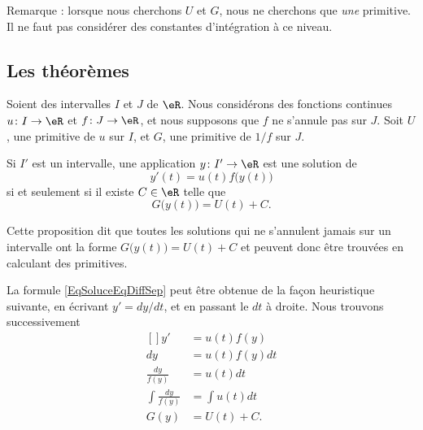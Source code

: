 Remarque : lorsque nous cherchons \( U\) et \( G\), nous ne cherchons que \emph{une} primitive. Il ne faut pas considérer des constantes d'intégration à ce niveau.

\subsection{Les théorèmes}

\begin{proposition}     \label{ProJLykrK}
	Soient des intervalles \( I\) et \( J\) de \( \eR\). Nous considérons des fonctions continues \( u\colon I\to \eR\) et \( f\colon J\to \eR\), et nous supposons que \( f\) ne s'annule pas sur \( J\). Soit \( U\), une primitive de \( u\) sur \( I\), et \( G\), une primitive de \( 1/f\) sur \( J\).

	Si \( I'\) est un intervalle, une application \( y\colon I'\to \eR\) est une solution de
	\begin{equation}		\label{EQooJVCQooGoVPVA}
		y'(t)=u(t)f\big( y(t) \big)
	\end{equation}
	si et seulement si il existe \( C\in \eR\) telle que
	\begin{equation}		\label{EqSoluceEqDiffSep}
		G\big( y(t) \big)=U(t)+C.
	\end{equation}
\end{proposition}
Cette proposition dit que toutes les solutions qui ne s'annulent jamais sur un intervalle ont la forme \( G\big( y(t) \big)=U(t)+C\) et peuvent donc être trouvées en calculant des primitives.

La formule \eqref{EqSoluceEqDiffSep} peut être obtenue de la façon heuristique suivante, en écrivant \( y'=dy/dt\), et en passant le \( dt\) à droite. Nous trouvons successivement
\begin{equation}
	\begin{aligned}[]
		y'                      & =u(t)f(y)    \\
		dy                      & =u(t)f(y)dt  \\
		\frac{ dy }{ f(y) }     & =u(t)dt      \\
		\int\frac{ dy }{ f(y) } & =\int u(t)dt \\
		G(y)                    & =U(t)+C.
	\end{aligned}
\end{equation}


